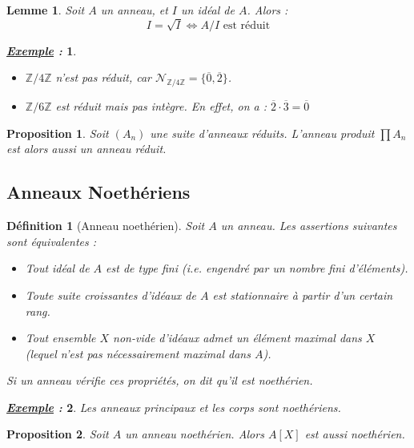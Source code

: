 \documentclass{article}           %
\newcommand\Z{\mathbb{Z}}
\newcommand\set[1]{\mathbb{#1}} 				%
\newcommand\cali[1]{\mathcal{#1}} 				%
\theoremstyle{break}
\theoremstyle{add}
\theoremstyle{break} %
\newtheorem{lemme}{Lemme}[section]
\newtheorem{definition}{Définition}[section]
\newtheorem{proposition}{Proposition}[section]
\theoremstyle{add}
\newtheorem*{exemple}{\textit{\underline{Exemple} :}}
\newcommand\NL{
\mbox{}
\vspace*{-\parsep}
\vspace*{-\baselineskip}}
\begin{document}
\begin{lemme}
Soit $A$ un anneau, et $I$ un idéal de $A$. Alors : \\
$$ I = \sqrt{I} \Longleftrightarrow A/I \textrm{ est réduit}$$ 
\end{lemme}

\begin{exemple}\NL
\begin{itemize}
\item $\Z/4\Z$ n'est pas réduit, car $\cali{N}_{\Z/4\Z} = \{ \overline{0}, \overline{2} \}$. 
\item $\Z/6\Z$ est réduit mais pas intègre. En effet, on a : $\overline{2} \cdot \overline{3} = \overline{0}$
\end{itemize}
\end{exemple}

\begin{proposition}
Soit $(A_n)$ une suite d'anneaux réduits. L'anneau produit $\prod{}{} A_n$ est alors aussi un anneau réduit.
\end{proposition}


\subsection{Anneaux Noethériens}

\begin{definition}[Anneau noethérien]
Soit $A$ un anneau. Les assertions suivantes sont équivalentes :
\begin{itemize}
\item Tout idéal de $A$ est de type fini (\textit{i.e.} engendré par un nombre fini d'éléments).
\item Toute suite croissantes d'idéaux de $A$ est stationnaire à partir d'un certain rang.
\item Tout ensemble $X$ 	non-vide d'idéaux admet un élément maximal dans $X$ (lequel n'est pas nécessairement maximal dans $A$).
\end{itemize}

Si un anneau vérifie ces propriétés, on dit qu'il est \textit{noethérien}.
\end{definition}

\begin{exemple}
Les anneaux principaux et les corps sont noethériens.
\end{exemple}

\begin{proposition}
Soit $A$ un anneau noethérien. Alors $A[X]$ est aussi noethérien.
\end{proposition}
\end{document}
